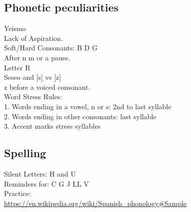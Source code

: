 \documentclass{article}
\begin{document}
\subsection{Phonetic peculiarities}
Yeismo\\
Lack of Aspiration.\\
Soft/Hard Consonants: B D G\\
After n m or a pause.\\
Letter R\\
Seseo and [s] vs [z]\\
z before a voiced consonant.\\
Word Stress Rules:\\

1. Words ending in a vowel, n or s: 2nd to last syllable\\

2. Words ending in other consonants: last syllable\\

3. Accent marks stress syllables

\subsection{Spelling}
Silent Letters: H and U\\
Reminders for: C G J LL V\\
Practice:\\

\url{https://en.wikipedia.org/wiki/Spanish_phonology#Sample}
\end{document}
